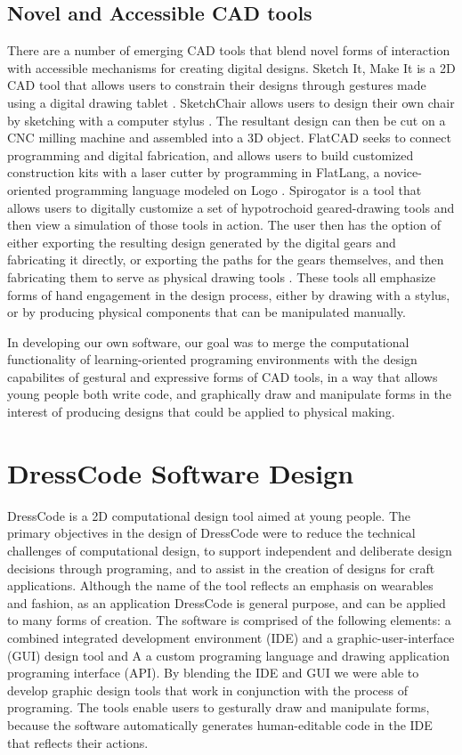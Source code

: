 \documentclass{sigchi}
\begin{document}
\subsection{Novel and Accessible CAD tools}
There are a number of emerging CAD tools that blend novel forms of interaction with accessible mechanisms for creating digital designs. Sketch It, Make It is a 2D CAD tool that allows users to constrain their designs through gestures made using a digital drawing tablet \cite{sketchit}. SketchChair allows users to design their own chair by sketching with a computer stylus \cite{sketchchair}. The resultant design can then be cut on a CNC milling machine and assembled into a 3D object. FlatCAD seeks to connect programming and digital fabrication, and allows users to build customized construction kits with a laser cutter by programming in FlatLang, a novice-oriented programming language modeled on Logo \cite{flatcad}. Spirogator is a tool that allows users to digitally customize a set of hypotrochoid geared-drawing tools and then view a simulation of those tools in action. The user then has the option of either exporting the resulting design generated by the digital gears and fabricating it directly, or exporting the  paths for the gears themselves, and then fabricating them to serve as physical drawing tools \cite{spirogator}. These tools all emphasize forms of hand engagement in the design process, either by drawing with a stylus, or by producing physical components that can be manipulated manually. 

In developing our own software, our goal was to merge the computational functionality of learning-oriented programing environments with the design capabilites of gestural and expressive forms of CAD tools, in a way that allows young people both write code, and graphically draw and manipulate forms in the interest of producing designs that could be applied to physical making. 

\section{DressCode Software Design}
DressCode is a 2D computational design tool aimed at young people. The primary objectives in the design of DressCode were to reduce the technical challenges of computational design, to support independent and deliberate design decisions through programing, and to assist in the creation of designs for craft applications. Although the name of the tool reflects an emphasis on wearables and fashion, as an application DressCode is general purpose, and can be applied to many forms of creation. The software is comprised of the following elements: a combined integrated development environment (IDE) and a graphic-user-interface (GUI) design tool and  A a custom programing language and drawing application programing interface (API). By blending the IDE and GUI we were able to develop graphic design tools that work in conjunction with the process of programing. The tools enable users to gesturally draw and manipulate forms, because the software automatically generates human-editable code in the IDE that reflects their actions.
\end{document}
